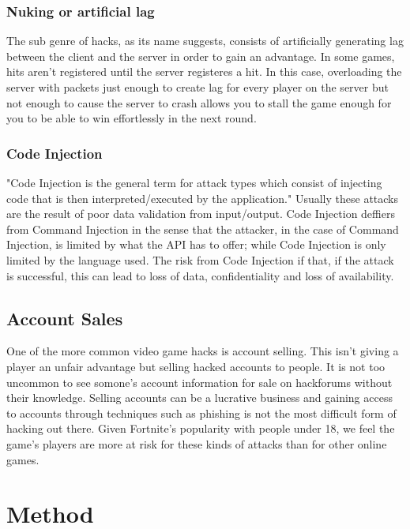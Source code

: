 \documentclass[sigconf]{acmart}
\begin{document}
\subsubsection{Nuking or artificial lag}
The sub genre of hacks, as its name suggests, consists of artificially generating lag between the 
client and the server in order to gain an advantage. In some games, hits aren't registered until 
the server registeres a hit. In this case, overloading the server with packets just enough to create lag
for every player on the server but not enough to cause the server to crash allows you to stall the game
enough for you to be able to win effortlessly in the next round.

\subsubsection{Code Injection}
"Code Injection is the general term for attack types which consist of injecting code that is then 
interpreted/executed by the application."\cite{codeinjection}
Usually these attacks are the result of poor data validation from input/output. Code Injection deffiers from
Command Injection in the sense that the attacker, in the case of Command Injection, is limited by what the API
has to offer; while Code Injection is only limited by the language used. The risk from Code Injection if that,
if the attack is successful, this can lead to loss of data, confidentiality and loss of availability.

\subsection{Account Sales}
One of the more common video game hacks is account selling. This isn't giving
a player an unfair advantage but selling hacked accounts to people. It is not 
too uncommon to see somone's account information for sale on hackforums 
without their knowledge. Selling accounts can be a lucrative business and gaining
access to accounts through techniques such as phishing is not the most difficult
form of hacking out there. Given Fortnite's popularity with people under 18, we
feel the game's players are more at risk for these kinds of attacks than for
other online games.


\section{Method}
\end{document}
